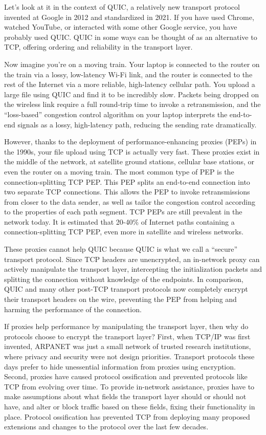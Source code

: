 Let's look at it in the context of QUIC, a relatively new transport protocol
invented at Google in 2012 and standardized in 2021. If you have used Chrome,
watched YouTube, or interacted with some other Google service, you have
probably used QUIC. QUIC in some ways can be thought of as an alternative to
TCP, offering ordering and reliability in the transport layer.

Now imagine you're on a moving train. Your laptop is connected to the router on
the train via a lossy, low-latency Wi-Fi link, and the router is connected to
the rest of the Internet via a more reliable, high-latency cellular path. You
upload a large file using QUIC and find it to be incredibly slow. Packets being
dropped on the wireless link require a full round-trip time to invoke a
retransmission, and the ``loss-based'' congestion control algorithm on your
laptop interprets the end-to-end signals as a lossy, high-latency path,
reducing the sending rate dramatically.

However, thanks to the deployment of performance-enhancing proxies (PEPs) in the
1990s, your file upload using TCP is actually very fast. These proxies exist in
the middle of the network, at satellite ground stations, cellular base
stations, or even the router on a moving train. The most common type of PEP is
the connection-splitting TCP PEP. This PEP splits an end-to-end connection into
two separate TCP connections. This allows the PEP to invoke retransmissions
from closer to the data sender, as well as tailor the congestion control
according to the properties of each path segment. TCP PEPs are still prevalent
in the network today. It is estimated that 20-40\% of Internet paths containing
a connection-splitting TCP PEP, even more in satellite and wireless networks.

These proxies cannot help QUIC because QUIC is what we call a ``secure''
transport protocol. Since TCP headers are unencrypted, an in-network proxy can
actively manipulate the transport layer, intercepting the initialization
packets and splitting the connection without knowledge of the endpoints. In
comparison, QUIC and many other post-TCP transport protocols now completely
encrypt their transport headers on the wire, preventing the PEP from helping
and harming the performance of the connection.

If proxies help performance by manipulating the transport layer, then why do
protocols choose to encrypt the transport layer? First, when TCP/IP was first
invented, ARPANET was just a small network of trusted research institutions,
where privacy and security were not design priorities. Transport protocols
these days prefer to hide unessential information from proxies using
encryption. Second, proxies have caused protocol ossification and prevented
protocols like TCP from evolving over time. To provide in-network assistance,
proxies have to make assumptions about what fields the transport layer should
or should not have, and alter or block traffic based on these fields, fixing
their functionality in place. Protocol ossification has prevented TCP from
deploying many proposed extensions and changes to the protocol over the last
few decades.

